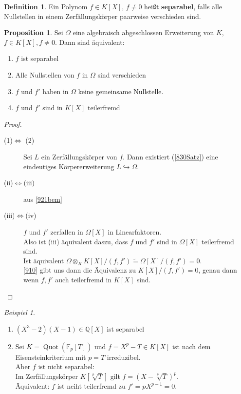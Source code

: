 \documentclass[10pt,a4paper]{article}
\newcommand{\Q}{\ensuremath{\mathbb{Q}}}
\newcommand{\isomorph}{\ensuremath{\tilde{=}}}
\newcommand{\Quot}{\operatorname{Quot}}
\newcounter{thm}[section]
\theoremstyle{definition}
\newtheorem{definition}[thm]{Definition}
\newtheorem{prop}[thm]{Proposition}
\theoremstyle{plain}
\theoremstyle{remark}
\newtheorem*{exm*}{Beispiel}
\begin{document}
\begin{definition}
	Ein Polynom $f\in K[X]$, $f\neq 0$ heißt \textbf{separabel}, falls alle Nullstellen  in einem Zerfällungskörper paarweise verschieden sind.
\end{definition}
\begin{prop}\label{923prop}
	Sei $\Omega$ eine algebraisch abgeschlossen Erweiterung von $K$, $f\in K[X],f\neq 0$. Dann sind äquivalent:
	\begin{enumerate}
		\item $f$ ist separabel
		\item Alle Nullstellen von $f$ in $\Omega$ sind verschieden
		\item $f$ und $f'$ haben in $\Omega$ keine gemeinsame Nullstelle.
		\item $f$ und $f'$ sind in $K[X]$ teilerfremd
	\end{enumerate}
\end{prop}
\begin{proof}
	\begin{description}
		\item[(1)$\Leftrightarrow$ (2)] Sei $L$ ein Zerfällungskörper von $f$. Dann existiert (\ref{830Satz}) eine eindeutiges Körpererweiterung $L\hookrightarrow \Omega$.
		\item[(ii)$\Leftrightarrow$(iii)] aus \ref{921bem}
		\item[(iii)$\Leftrightarrow$(iv)] $f$ und $f'$ zerfallen in $\Omega[X]$ in Linearfaktoren.\\
		Also ist (iii) äquivalent daszu, dass $f$ und $f'$ sind in $\Omega[X]$ teilerfremd sind.\\
		Ist äquivalent $\Omega\otimes_KK[X]/(f,f')\isomorph\Omega[X]/(f,f')=0$.\\
		\ref{910} gibt uns dann die Äquivalenz zu $K[X]/(f,f')=0$, genau dann wenn $f,f'$ auch teilerfremd in $K[X]$ sind.
	\end{description}
\end{proof}

\begin{exm*}
	\begin{enumerate}
		\item $(X^3-2)(X-1)\in \Q[X]$ ist separabel
		\item Sei $K=\Quot(\mathbb{F}_p[T])$ und $f=X^p-T\in K[X]$ ist nach dem Eisensteinkriterium mit $p=T$ irreduzibel.\\
		Aber $f$ ist nicht separabel:\\
		Im Zerfällungskörper $K[\sqrt[p]{T}]$ gilt $f=(X-\sqrt[p]{T})^p$.\\
		Äquivalent: $f$ ist nciht teilerfremd zu $f'=pX^{p-1}=0$.
	\end{enumerate}
\end{exm*}
\end{document}
